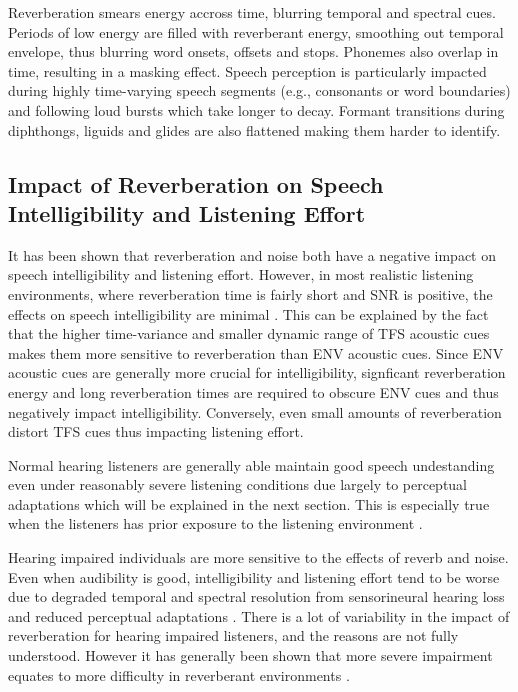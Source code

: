 Reverberation smears energy accross time, blurring temporal and spectral cues. Periods of low energy are filled with reverberant energy, smoothing out temporal envelope, thus blurring word onsets, offsets and stops. Phonemes also overlap in time, resulting in a masking effect.  Speech perception is particularly impacted during highly time-varying speech segments (e.g., consonants or word boundaries) and following loud bursts which take longer to decay. Formant transitions during diphthongs, liguids and glides are also flattened making them harder to identify.

\subsection{Impact of Reverberation on Speech Intelligibility and Listening Effort} \label{section:reverb_si}

It has been shown that reverberation and noise both have a negative impact on speech intelligibility and listening effort. However, in most realistic listening environments, where reverberation time is fairly short and SNR is positive, the effects on speech intelligibility are minimal \citep{schepker2016perceived}. This can be explained by the fact that the higher time-variance and smaller dynamic range of TFS acoustic cues makes them more sensitive to reverberation than ENV acoustic cues. Since ENV acoustic cues are generally more crucial for intelligibility, signficant reverberation energy and long reverberation times are required to obscure ENV cues and thus negatively impact intelligibility. Conversely, even small amounts of reverberation distort TFS cues thus impacting listening effort.

Normal hearing listeners are generally able maintain good speech undestanding even under reasonably severe listening conditions \citep{schepker2016perceived} due largely to perceptual adaptations which will be explained in the next section. This is especially true when the listeners has prior exposure to the listening environment \citep{george2010measuring}.

Hearing impaired individuals are more sensitive to the effects of reverb and noise. Even when audibility is good, intelligibility and listening effort tend to be worse due to degraded temporal and spectral resolution from sensorineural hearing loss \citep{reinhart2018listener} and reduced perceptual adaptations \citep{srinivasan2017role, roberts2003effects}. There is a lot of variability in the impact of reverberation for hearing impaired listeners, and the reasons are not fully understood. However it has generally been shown that more severe impairment equates to more difficulty in reverberant environments \citep{xia2018effects}.

